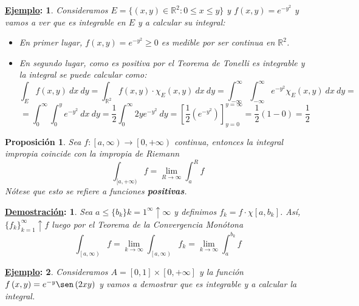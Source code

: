 \documentclass[10pt,a4paper,openright]{book}
\theoremstyle{break}
\newtheorem*{prop}{Proposición}
\newtheorem*{demo}{\underline{Demostración}:}
\newtheorem*{ej}{\underline{Ejemplo}:}
\newcommand{\dif}[1]{\ d#1}
\begin{document}
\begin{ej}
Consideramos $E = \{ \left(x, y\right) \in \mathbb{R}^2 : 0 \leq x \leq y\}$ y $f \left(x, y\right) = e^{-y^2}$ y vamos a ver que es integrable en $E$ y a calcular su integral:
\begin{itemize}
    \item En primer lugar, $f \left(x, y\right) = e^{-y^2} \ge 0$ es medible por ser continua en $\mathbb{R}^2$.
    \item En segundo lugar, como es positiva por el Teorema de Tonelli es integrable y la integral se puede calcular como: 
    $$\int_E f \left(x, y\right) \dif{x} \dif{y} = \int_{\mathbb{R}^2} f \left(x, y\right) \cdot \chi_{E} \left(x, y\right) \dif{x} \dif{y} = \int_{-\infty}^{\infty} \int_{-\infty}^{\infty} e^{-y^2}\chi_E \left(x, y\right) \dif{x} \dif{y} =$$
    $$=\int_{0}^{\infty} \int_{0}^{y} e^{-y^2} \dif{x} \dif{y} = \frac{1}{2} \int_{0}^{\infty} 2ye^{-y^2} \dif{y} = \left[\frac{1}{2} \left(e^{-y^2}\right)\right]_{y=0}^{y=\infty} = \frac{1}{2} \left(1 - 0\right) =\frac{1}{2}$$
\end{itemize}
\end{ej}

\begin{prop}
Sea $f: \left[a, \infty\right) \rightarrow \left[0, +\infty\right)$ continua, entonces la integral impropia coincide con la impropia de Riemann
$$\int_{[a, +\infty)} f = \lim_{R \rightarrow \infty} \int_a^R f $$
Nótese que esto se refiere a funciones \textbf{positivas}.
\end{prop}
\begin{demo}
Sea $a \le \{b_k\}{k=1}^{\infty}\uparrow \infty$ y definimos $f_k = f \cdot \chi{\left[a, b_k\right]}$. Así, $\{f_k\}_{k=1}^{\infty}\uparrow f$ luego por el Teorema de la Convergencia Monótona
$$\int_{\left[a, \infty\right)} f = \lim_{k \rightarrow \infty} \int_{\left[a, \infty\right)} f_k = \lim_{k \rightarrow \infty} \int_a^{b_k} f $$
\end{demo}

\begin{ej}
Consideramos $A = \left[0, 1\right] \times \left[0, +\infty\right]$ y la función $f \left(x, y\right) = e^{-y} \sen \left(2xy\right)$ y vamos a demostrar que es integrable y a calcular la integral.
\end{ej}
\end{document}
